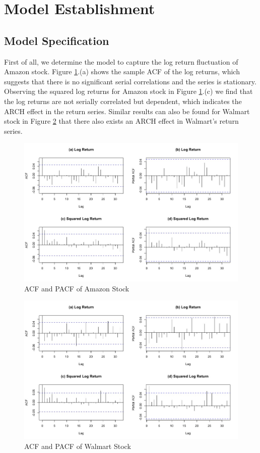 \documentclass[paper=a4, fontsize=11pt]{article}
\begin{document}
\section{Model Establishment}
\subsection{Model Specification}
First of all, we determine the model to capture the log return fluctuation of Amazon stock. Figure \ref{cf_AMZN}.(a) shows the sample ACF of the log returns, which suggests that there is no significant serial correlations and the series is stationary. Observing the squared log returns for Amazon stock in Figure \ref{cf_AMZN}.(c) we find that the log returns are not serially correlated but dependent, which indicates the ARCH effect in the return series. Similar results can also be found for Walmart stock in Figure \ref{cf_WMT} that there also exists an ARCH effect in Walmart's return series.

\begin{figure}[!htbp]
\centering
\includegraphics[width = 5in]{img/cf_AMZN}
\caption{ACF and PACF of Amazon Stock}
\label{cf_AMZN}
\end{figure}

\begin{figure}[!htbp]
\centering
\includegraphics[width = 5in]{img/cf_WMT}
\caption{ACF and PACF of Walmart Stock}
\label{cf_WMT}
\end{figure}
\end{document}
